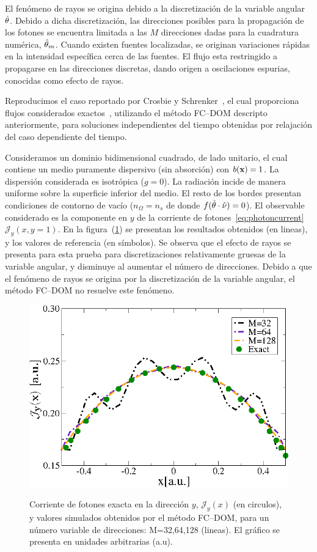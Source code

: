 El fenómeno de rayos se origina debido a la discretización 
de la variable angular $\hat{\theta}$. Debido a dicha discretización, 
las direcciones posibles para la propagación de los fotones 
se encuentra limitada a las $M$ direcciones dadas para la cuadratura 
numérica, $\hat{\theta}_m$. Cuando existen fuentes localizadas, 
se originan variaciones rápidas en la intensidad específica 
cerca de las fuentes. El flujo esta restringido a propagarse 
en las direcciones discretas, dando origen a oscilaciones 
espurias, conocidas como efecto de rayos.

Reproducimos el caso reportado por Crosbie y Schrenker~\cite{Crosbie1984}, 
el cual proporciona flujos considerados exactos~\cite{Ramankutty1997,tagnekamdem2015}, 
utilizando el método FC--DOM descripto anteriormente, para soluciones independientes 
del tiempo obtenidas por relajación del caso dependiente del tiempo.

Consideramos un dominio bidimensional cuadrado, de lado unitario, 
el cual contiene un medio puramente dispersivo (sin absorción) 
con $b(\mathbf{x})=1$. La dispersión considerada es isotrópica ($g=0$). 
La radiación incide de manera uniforme sobre la superficie inferior del medio. 
El resto de los bordes presentan condiciones de contorno de vacío ($n_{\Omega}=n_{s}$ 
de donde $f(\hat{\theta} \cdot \hat{\nu})=0$). El observable considerado es la componente en $y$ de la corriente de fotones~\eqref{eq:photoncurrent} $\mathcal{J}_y(x,y=1)$. En la figura~(\ref{fig:fluxph3}) 
se presentan los resultados obtenidos (en lineas), y los valores de referencia (en símbolos). 
Se observa que el efecto de rayos se presenta para esta prueba para discretizaciones 
relativamente gruesas de la variable angular, y disminuye al aumentar 
el número de direcciones. Debido a que el fenómeno de rayos se origina 
por la discretización de la variable angular, el método FC--DOM 
no resuelve este fenómeno. 
\begin{figure}[h!]
\centering
  \includegraphics[width=0.48\linewidth]{figuras/raycurrent.eps}\\
  \caption{
Corriente de fotones exacta en la dirección $y$, $\mathcal{J}_y(x)$ (en circulos), 
y valores simulados obtenidos por el método FC--DOM, 
para un número variable de direcciones: M=32,64,128 (lineas). El gráfico 
se presenta en unidades arbitrarias (a.u).}
 \label{fig:fluxph3}
\end{figure}

